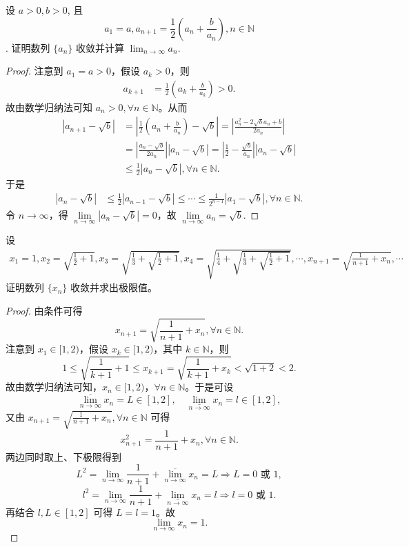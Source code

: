 \documentclass[../../main.tex]{subfiles}%
\begin{document}
\begin{example}
设 $a > 0, b > 0$, 且 \[a_1 = a, a_{n+1} = \frac{1}{2} \left( a_n + \frac{b}{a_n} \right), n \in \mathbb{N}\].
证明数列 $\{a_n\}$ 收敛并计算 $\lim_{n \to \infty} a_n$.
\end{example}
\begin{proof}
注意到 $a_1 = a > 0$，假设 $a_k > 0$，则
\begin{align*}
a_{k+1} &= \frac{1}{2} \left( a_k + \frac{b}{a_k} \right) > 0.
\end{align*}
故由数学归纳法可知 $a_n > 0, \forall n \in \mathbb{N}$。从而
\begin{align*}
\left| a_{n+1} - \sqrt{b} \right| &= \left| \frac{1}{2} \left( a_n + \frac{b}{a_n} \right) - \sqrt{b} \right| = \left| \frac{a_n^2 - 2\sqrt{b}a_n + b}{2a_n} \right| \\
&= \left| \frac{a_n - \sqrt{b}}{2a_n} \right| \left| a_n - \sqrt{b} \right| = \left| \frac{1}{2} - \frac{\sqrt{b}}{a_n} \right| \left| a_n - \sqrt{b} \right| \\
&\leqslant \frac{1}{2} \left| a_n - \sqrt{b} \right|, \forall n \in \mathbb{N}.
\end{align*}
于是
\begin{align*}
\left| a_n - \sqrt{b} \right| &\leqslant \frac{1}{2} \left| a_{n-1} - \sqrt{b} \right| \leqslant \cdots \leqslant \frac{1}{2^{n-1}} \left| a_1 - \sqrt{b} \right|, \forall n \in \mathbb{N}.
\end{align*}
令 $n \rightarrow \infty$，得 $\underset{n \to \infty}{\lim} \left| a_n - \sqrt{b} \right| = 0$，故 $\underset{n \to \infty}{\lim} a_n = \sqrt{b}$.
\end{proof}

\begin{example}
设
\begin{align*}
x_1 = 1, 
x_2 = \sqrt{\frac{1}{2} + 1}, 
x_3 = \sqrt{\frac{1}{3} + \sqrt{\frac{1}{2} + 1}}, 
x_4 = \sqrt{\frac{1}{4} + \sqrt{\frac{1}{3} + \sqrt{\frac{1}{2} + 1}}}, 
\cdots ,
x_{n+1} = \sqrt{\frac{1}{n+ 1}  + x_n}, \cdots
\end{align*}
证明数列 $\{x_n\}$ 收敛并求出极限值。
\end{example}
\begin{proof}
由条件可得  
\[
x_{n+1}=\sqrt{\frac{1}{n+1}+x_n},\forall n\in \mathbb{N}.
\]
注意到 $x_1\in [1,2)$，假设 $x_k\in [1,2)$，其中 $k\in \mathbb{N}$，则  
\[
1\leqslant \sqrt{\frac{1}{k+1}+1}\leqslant x_{k+1}=\sqrt{\frac{1}{k+1}+x_k}<\sqrt{1+2}<2.
\]
故由数学归纳法可知，$x_n\in [1,2)$，$\forall n\in \mathbb{N}$。于是可设  
\[
\underset{n\rightarrow \infty}{\overline{\lim }}x_n=L\in [1,2],\quad \underset{n\rightarrow \infty}{\underline{\lim }}x_n=l\in [1,2],
\]
又由 $x_{n+1}=\sqrt{\frac{1}{n+1}+x_n},\forall n\in \mathbb{N}$ 可得  
\[
x_{n+1}^{2}=\frac{1}{n+1}+x_n,\forall n\in \mathbb{N}.
\]
两边同时取上、下极限得到  
\[
L^2=\underset{n\rightarrow \infty}{\lim}\frac{1}{n+1}+\underset{n\rightarrow \infty}{\overline{\lim }}x_n=L\Rightarrow L=0\text{ 或 }1,
\]
\[
l^2=\underset{n\rightarrow \infty}{\lim}\frac{1}{n+1}+\underset{n\rightarrow \infty}{\underline{\lim }}x_n=l\Rightarrow l=0\text{ 或 }1.
\]
再结合 $l,L\in [1,2]$ 可得 $L=l=1$。故  
\[
\underset{n\rightarrow \infty}{\lim}x_n=1.
\]
\end{proof}
\end{document}
